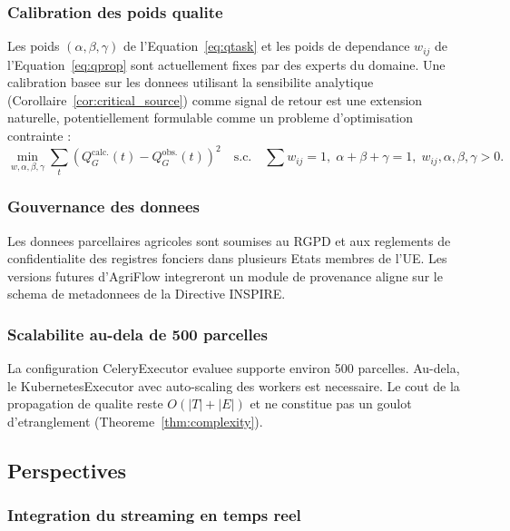 \documentclass[12pt,a4paper]{article}
\theoremstyle{plain}
\theoremstyle{definition}
\theoremstyle{remark}
\begin{document}
	\subsubsection{Calibration des poids qualite}
	
	Les poids $(\alpha,\beta,\gamma)$ de l'Equation~\eqref{eq:qtask} et
	les poids de dependance $w_{ij}$ de l'Equation~\eqref{eq:qprop} sont
	actuellement fixes par des experts du domaine. Une calibration basee
	sur les donnees utilisant la sensibilite analytique
	(Corollaire~\ref{cor:critical_source}) comme signal de retour est une
	extension naturelle, potentiellement formulable comme un probleme
	d'optimisation contrainte :
	\begin{equation}
		\min_{w,\alpha,\beta,\gamma}
		\sum_t \left(Q_G^{\text{calc.}}(t) - Q_G^{\text{obs.}}(t)\right)^2
		\quad \text{s.c.} \quad
		\sum w_{ij}=1,\; \alpha+\beta+\gamma=1,\; w_{ij},\alpha,\beta,\gamma>0.
		\label{eq:weight_optim}
	\end{equation}
	
	\subsubsection{Gouvernance des donnees}
	
	Les donnees parcellaires agricoles sont soumises au RGPD et aux
	reglements de confidentialite des registres fonciers dans plusieurs
	Etats membres de l'UE. Les versions futures d'AgriFlow integreront
	un module de provenance aligne sur le schema de metadonnees de la
	Directive INSPIRE.
	
	\subsubsection{Scalabilite au-dela de 500 parcelles}
	
	La configuration CeleryExecutor evaluee supporte environ 500 parcelles.
	Au-dela, le KubernetesExecutor avec auto-scaling des workers est
	necessaire. Le cout de la propagation de qualite reste $O(|T|+|E|)$
	et ne constitue pas un goulot d'etranglement (Theoreme~\ref{thm:complexity}).
	
	\subsection{Perspectives}
	
	\subsubsection{Integration du streaming en temps reel}
	
\end{document}
